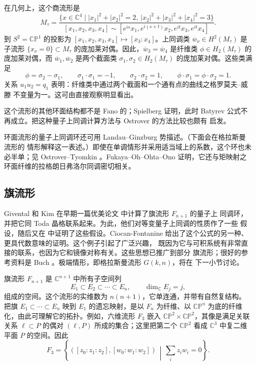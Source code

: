 在几何上，这个商流形是
\[
  M_\tau=
  \frac{\{x\in\mathbb C^4\mid
  |x_1|^2+|x_2|^2=2,\ |x_2|^2+|x_3|^2+|x_4|^2=3\}}
  {[x_1,x_2,x_3,x_4]\sim
  [e^{is}x_1,e^{i(s+t)}x_2,e^{it}x_3,e^{it}x_4]}.
\]
到 $S^2=\mathbb{CP}^1$ 的投影为
$[x_1,x_2,x_3,x_4]\mapsto[x_3:x_4]$。上同调类
$\overline w_\nu\in H^2(M_\tau)$ 是子流形
$\{x_\nu=0\}\subset M_\tau$ 的庞加莱对偶。因此，$\overline w_3=\overline w_4$ 是纤维类
$\phi\in H_2(M_\tau)$ 的庞加莱对偶，而 $\overline w_1,\overline w_2$ 是两个截面类
$\sigma_1,\sigma_2\in H_2(M_\tau)$ 的庞加莱对偶。这些类满足
\[
  \phi=\sigma_2-\sigma_1,
  \qquad \sigma_1\cdot\sigma_1=-1,
  \qquad \sigma_2\cdot\sigma_2=1,
  \qquad \phi\cdot\sigma_1=\phi\cdot\sigma_2=1.
\]
关系 $u_1u_2=q_1$ 表明：纤维类中通过两个截面和一个通有点的曲线之格罗莫夫--威滕
不变量为一。这可由直接观察明显看出。

这个流形的其他环面结构都不是 Fano 的；Spielberg  证明，此时 Batyrev
公式不再成立。把这种量子上同调计算方法与 Ostrover  的方法比较也颇有
启发。

环面流形的量子上同调环还可用 Landau--Ginzburg 势描述。（下面会在格拉斯曼流形的
情形解释这一表述。）即使在单调情形并采用适当域上的系数，这个环也未必半单；见
Ostrover--Tyomkin 。Fukaya--Oh--Ohta--Ono
 证明，它还与矩映射之环面纤维的拉格朗日弗洛尔同调密切相关。

\subsection{旗流形}\label{subsec:11-3-2}

Givental 和 Kim 在早期一篇优美论文  中计算了旗流形 $F_{n+1}$ 的量子上
同调环，并把它同 Toda 晶格联系起来。为此，他们对等变量子上同调的性质作了一些
假设，随后又在  中证明了这些假设。Ciocan-Fontanine
 给出了这个公式的另一种、更具代数意味的证明。这个例子引起了广泛兴趣，
既因为它与可积系统有非常直接的联系，也因为它和镜像对称有关。这些思想已推广到部分
旗流形；很好的参考资料是 Buch 。极端情形，即格拉斯曼流形 $G(k,n)$，将在
下一小节讨论。

旗流形 $F_{n+1}$ 是 $\mathbb C^{n+1}$ 中所有子空间列
\[
  E_1\subset E_2\subset\cdots\subset E_n,
  \qquad \dim_{\mathbb C}E_j=j,
\]
组成的空间。这个流形的实维数为 $n(n+1)$，它单连通，并带有自然复结构。把旗
$E_1\subset\cdots\subset E_n$ 映到 $E_1$ 的遗忘映射，是以 $F_n$ 为纤维、以
$\mathbb{CP}^n$ 为底的纤维化，由此可理解它的拓扑。例如，六维流形 $F_3$ 嵌入
$\mathbb{CP}^2\times\mathbb{CP}^2$，其像是满足关联关系 $\ell\subset P$ 的偶对
$(\ell,P)$ 所成的集合；这里把第二个 $\mathbb{CP}^2$ 看成
$\mathbb C^3$ 中复二维平面 $P$ 的空间。因此
\[
  F_3=\left\{([z_0:z_1:z_2],[w_0:w_1:w_2])\,\middle|\,
  \sum_i z_iw_i=0\right\}.
\]

